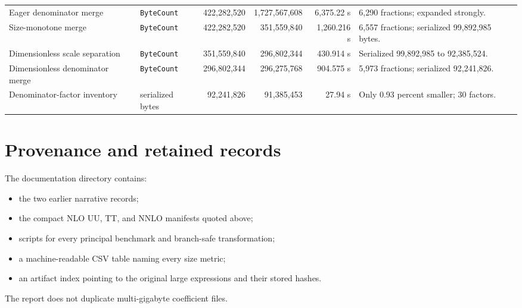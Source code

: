 \documentclass[11pt]{article}
\newcommand{\code}[1]{\texttt{#1}}
\begin{document}
\begin{landscape}
\begin{longtable}{@{}llrrrl@{}}
Eager denominator merge & \code{ByteCount} & 422,282,520 & 1,727,567,608 & 6,375.22 s & 6,290 fractions; expanded strongly.\\
Size-monotone merge & \code{ByteCount} & 422,282,520 & 351,559,840 & 1,260.216 s & 6,557 fractions; serialized 99,892,985 bytes.\\
Dimensionless scale separation & \code{ByteCount} & 351,559,840 & 296,802,344 & 430.914 s & Serialized 99,892,985 to 92,385,524.\\
Dimensionless denominator merge & \code{ByteCount} & 296,802,344 & 296,275,768 & 904.575 s & 5,973 fractions; serialized 92,241,826.\\
Denominator-factor inventory & serialized bytes & 92,241,826 & 91,385,453 & 27.94 s & Only 0.93 percent smaller; 30 factors.\\
\bottomrule
\end{longtable}
\end{landscape}

\section{Provenance and retained records}

The documentation directory contains:
\begin{itemize}
  \item the two earlier narrative records;
  \item the compact NLO UU, TT, and NNLO manifests quoted above;
  \item scripts for every principal benchmark and branch-safe transformation;
  \item a machine-readable CSV table naming every size metric;
  \item an artifact index pointing to the original large expressions and their
  stored hashes.
\end{itemize}
The report does not duplicate multi-gigabyte coefficient files.
\end{document}
